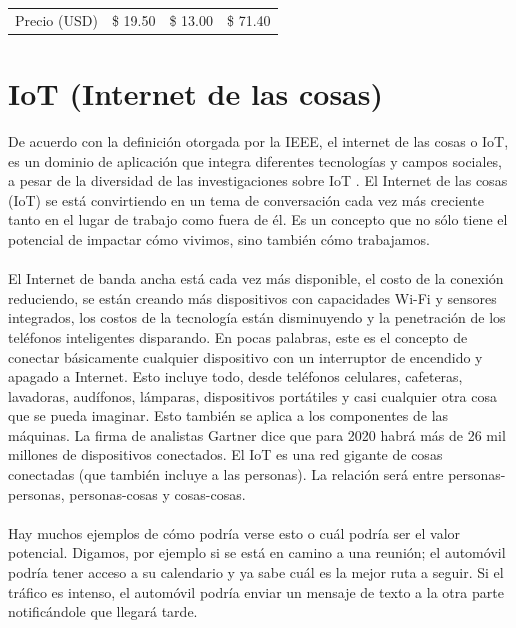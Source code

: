 \begin{longtable}{|M{2.2cm}|M{4.0cm}|M{4.0cm}|M{4.0cm}|}
    Precio (USD) & \$ 19.50 & \$ 13.00 & \$ 71.40
    \hline
	
\end{longtable}

\pagebreak

\paragraph{}

\section{IoT (Internet de las cosas)}
De acuerdo con la definición otorgada por la IEEE, el internet de las cosas o IoT, es un dominio de aplicación que integra diferentes tecnologías y campos sociales, a pesar de la diversidad de las investigaciones sobre IoT \citep{MarcoTeoricoIoT}. El Internet de las cosas (IoT) se está convirtiendo en un tema de conversación cada vez más creciente tanto en el lugar de trabajo como fuera de él. Es un concepto que no sólo tiene el potencial de impactar cómo vivimos, sino también cómo trabajamos. 
\paragraph{}
El Internet de banda ancha está cada vez más disponible, el costo de la conexión reduciendo, se están creando más dispositivos con capacidades Wi-Fi y sensores integrados, los costos de la tecnología están disminuyendo y la penetración de los teléfonos inteligentes disparando. En pocas palabras, este es el concepto de conectar básicamente cualquier dispositivo con un interruptor de encendido y apagado a Internet. Esto incluye todo, desde teléfonos celulares, cafeteras, lavadoras, audífonos, lámparas, dispositivos portátiles y casi cualquier otra cosa que se pueda imaginar. Esto también se aplica a los componentes de las máquinas. La firma de analistas Gartner dice que para 2020 habrá más de 26 mil millones de dispositivos conectados. El IoT es una red gigante de cosas conectadas (que también incluye a las personas). La relación será entre personas-personas, personas-cosas y cosas-cosas.
\paragraph{}
Hay muchos ejemplos de cómo podría verse esto o cuál podría ser el valor potencial. Digamos, por ejemplo si se está en camino a una reunión; el automóvil podría tener acceso a su calendario y ya sabe cuál es la mejor ruta a seguir. Si el tráfico es intenso, el automóvil podría enviar un mensaje de texto a la otra parte notificándole que llegará tarde. 
